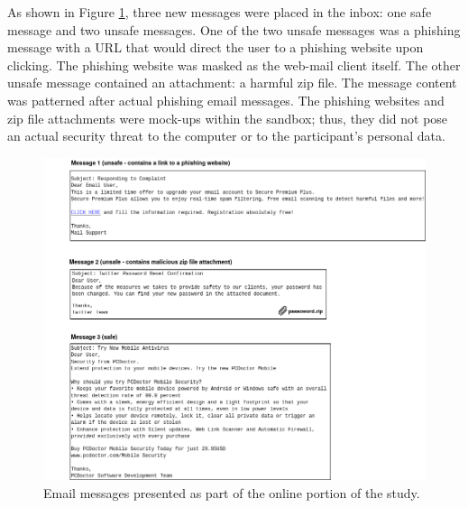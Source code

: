 As shown in Figure \ref{fig:emails}, three new messages were placed in the inbox: one safe message and two unsafe messages. One of the two unsafe messages was a phishing message with a URL that would direct the user to a phishing website upon clicking. The phishing website was masked as the web-mail client itself. The other unsafe message contained an attachment: a harmful zip file. The message content was patterned after actual phishing email messages. The phishing websites and zip file attachments were mock-ups within the sandbox; thus, they did not pose an actual security threat to the computer or to the participant's personal data. 
\begin{figure}[tpb]
  \centering
\includegraphics[width=\columnwidth, keepaspectratio=true]{img/emails.png}
  \caption{Email messages presented as part of the online portion of the study.}
  \label{fig:emails}
\end{figure}

